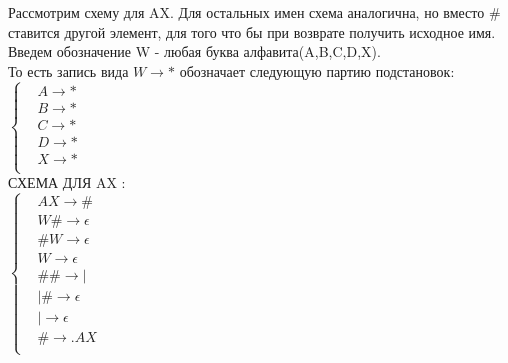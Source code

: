 \documentclass[a4paper,25pt]{book}
\begin{document}
Рассмотрим схему для AX. Для остальных имен схема аналогична, но вместо $\#$ ставится другой элемент, для того что бы при возврате получить исходное имя.\\

Введем обозначение W - любая буква алфавита(A,B,C,D,X).\\

То есть запись вида $ W \rightarrow *$ обозначает следующую партию подстановок:
$ \left\{
\begin{aligned}
& A \rightarrow * \\
& B \rightarrow * \\
& C \rightarrow * \\
& D \rightarrow * \\
& X \rightarrow * \\
\end{aligned}
\right.$\\
СХЕМА ДЛЯ AX :\\
$ \left\{
\begin{aligned}
& AX \rightarrow \# \\
& W\#  \rightarrow \epsilon \\
& \#W \rightarrow \epsilon \\
& W \rightarrow \epsilon \\
& \#\# \rightarrow | \\
& |\# \rightarrow \epsilon \\
& | \rightarrow \epsilon \\
& \# \rightarrow .AX \\
\end{aligned}
\right.$
\\\\
\end{document}
